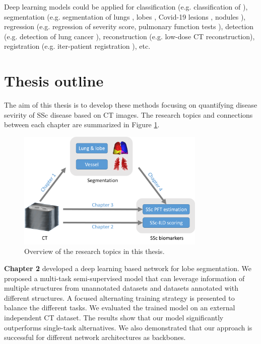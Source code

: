 Deep learning models could be applied for classification (e.g. classification of ), segmentation (e.g. segmentation of lungs \cite{skourt2018lung, yoo2021automated}, lobes \cite{Jia2021}, Covid-19 lesions \cite{saood2021covid}, nodules \cite{wu2019survey}), regression (e.g. regression of severity score\cite{Jia2022}, pulmonary function tests \cite{jia2023automatic}), detection (e.g. detection of lung cancer \cite{shakeel2019lung}), reconstruction (e.g. low-dose CT reconstruction\cite{liang2020model}), registration (e.g. iter-patient registration \cite{de2019deep}), etc. 

\section{Thesis outline}

The aim of this thesis is to develop these methods focusing on quantifying disease sevirity of SSc disease based on CT images. The research topics and connections between each chapter are summarized in Figure \ref{fig:overview}. 

\begin{figure}[tb]
    \centering
    \includegraphics[width=0.8\textwidth]{Introduction/figures/outline.png}
    \caption{Overview of the research topics in this thesis.}
    \label{fig:overview}
\end{figure}


\textbf{Chapter 2} developed a deep learning based network for lobe segmentation. We proposed a multi-task semi-supervised model that can leverage information of multiple structures from unannotated datasets and datasets annotated with different structures. A focused alternating training strategy is presented to balance the different tasks. We evaluated the trained model on an external independent CT dataset. The results show that our model significantly outperforms single-task alternatives. We also demonstrated that our approach is successful for different network architectures as backbones. 

